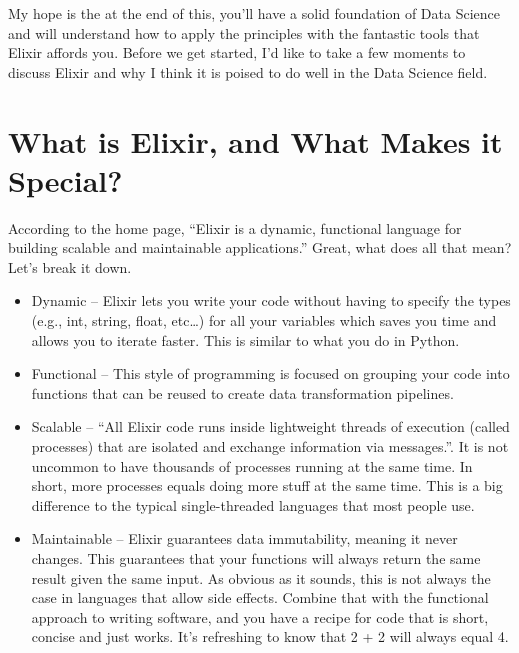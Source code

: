 \documentclass[
  letterpaper,
  DIV=11,
  numbers=noendperiod]{scrreprt}
\begin{document}
My hope is the at the end of this, you'll have a solid foundation of
Data Science and will understand how to apply the principles with the
fantastic tools that Elixir affords you. Before we get started, I'd like
to take a few moments to discuss Elixir and why I think it is poised to
do well in the Data Science field.

\hypertarget{what-is-elixir-and-what-makes-it-special}{%
\section*{What is Elixir, and What Makes it
Special?}\label{what-is-elixir-and-what-makes-it-special}}

According to the home page, ``Elixir is a dynamic, functional language
for building scalable and maintainable applications.'' Great, what does
all that mean? Let's break it down.

\begin{itemize}
\item
  Dynamic -- Elixir lets you write your code without having to specify
  the types (e.g., int, string, float, etc\ldots) for all your variables
  which saves you time and allows you to iterate faster. This is similar
  to what you do in Python.
\item
  Functional -- This style of programming is focused on grouping your
  code into functions that can be reused to create data transformation
  pipelines.
\item
  Scalable -- ``All Elixir code runs inside lightweight threads of
  execution (called processes) that are isolated and exchange
  information via messages.''. It is not uncommon to have thousands of
  processes running at the same time. In short, more processes equals
  doing more stuff at the same time. This is a big difference to the
  typical single-threaded languages that most people use.
\item
  Maintainable -- Elixir guarantees data immutability, meaning it never
  changes. This guarantees that your functions will always return the
  same result given the same input. As obvious as it sounds, this is not
  always the case in languages that allow side effects. Combine that
  with the functional approach to writing software, and you have a
  recipe for code that is short, concise and just works. It's refreshing
  to know that 2 + 2 will always equal 4.
\end{itemize}
\end{document}
